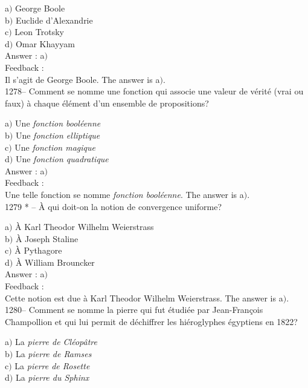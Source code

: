 \documentclass[letterpaper, 12pt]{article}
\begin{document}
a$)$ George Boole \\
b$)$ Euclide d'Alexandrie \\
c$)$ Leon Trotsky \\
d$)$ Omar Khayyam\\

Answer : a$)$\\

Feedback : \\
Il s'agit de George Boole.
The answer is  a$)$.\\

1278-- Comment se nomme une fonction qui associe une valeur de v\'erit\'e
(vrai ou faux) \`a chaque
\'el\'ement d'un ensemble de propositions?

a$)$ Une {\sl fonction bool\'eenne} \\
b$)$ Une {\sl fonction elliptique} \\
c$)$ Une {\sl fonction magique} \\
d$)$ Une {\sl fonction quadratique}\\

Answer : a$)$\\

Feedback : \\
Une telle fonction se nomme {\sl fonction bool\'eenne}.
The answer is  a$)$.\\

1279 * -- \`A qui doit-on la notion de convergence uniforme?

a$)$ \`A Karl Theodor Wilhelm Weierstrass \\
b$)$ \`A Joseph Staline \\
c$)$ \`A Pythagore \\
d$)$ \`A William Brouncker\\

Answer : a$)$\\

Feedback : \\
Cette notion est due \`a Karl Theodor Wilhelm Weierstrass.
The answer is  a$)$.\\

1280-- Comment se nomme la pierre qui fut \'etudi\'ee par
Jean-Fran\c cois Champollion et qui lui permit de d\'echiffrer les
hi\'eroglyphes \'egyptiens en 1822?

a$)$ La {\sl pierre de Cl\'eop\^atre} \\
b$)$ La {\sl pierre de Ramses} \\
c$)$ La {\sl pierre de Rosette} \\
d$)$ La {\sl pierre du Sphinx}\\
\end{document}
